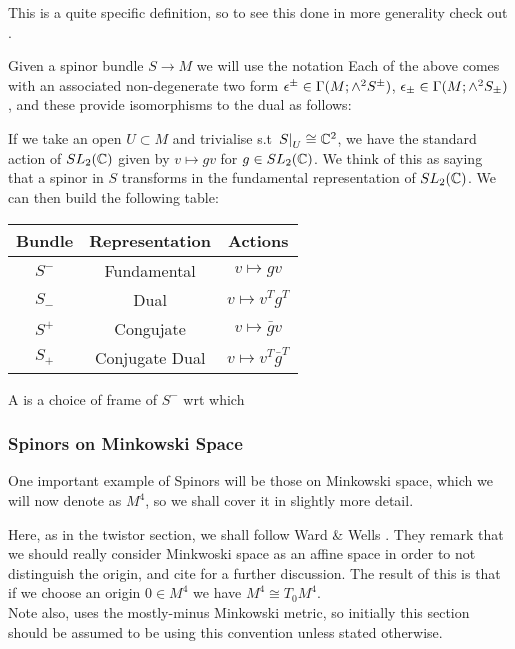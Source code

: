 \documentclass{article}
\begin{document}
\begin{remark}
	This is a quite specific definition, so to see this done in more generality check out \cite{Michelsohn1989}. 
\end{remark}

\begin{notation}
	Given a spinor bundle $S \to M$ we will use the notation 
Each of the above comes with an associated non-degenerate two form $\epsilon^\pm \in \Gamma(M;\wedge^2 S^\pm)$, $ \epsilon_\pm \in \Gamma(M; \wedge^2 S_\pm)$, and these provide isomorphisms to the dual as follows:
\end{notation}
If we take an open $U \subset M$ and trivialise s.t $\left. S \right\rvert_{U} \cong \mathbb{C}^2$, we have the standard action of $SL_2(\mathbb{C})$ given by $v \mapsto gv$ for $g \in SL_2(\mathbb{C})$. We think of this as saying that a spinor in $S$ transforms in the fundamental representation of $SL_2(\mathbb{C})$. We can then build the following table:
\begin{center}
\begin{tabular}{c|c|c}
	Bundle & Representation & Actions \\ \hline \hline 
		$S^-$ & Fundamental & $v \mapsto gv$ \\ \hline 
		$S_-$ & Dual & $v \mapsto v^T g^T $ \\ \hline 
		$S^+$ & Congujate & $v \mapsto \bar{g} v$ \\ \hline 
		$S_+$ & Conjugate Dual & $v \mapsto v^T \bar{g}^T$
\end{tabular}
\end{center}
\begin{definition}
	A  is a choice of frame of $S^-$ wrt which 
\end{definition}
\subsubsection{Spinors on Minkowski Space}
One important example of Spinors will be those on Minkowski space, which we will now denote as $M^4$, so we shall cover it in slightly more detail. 
\begin{remark}
	Here, as in the twistor section, we shall follow Ward \& Wells \cite{Ward1991}. They remark that we should really consider Minkwoski space as an affine space in order to not distinguish the origin, and cite \cite{Shirokov1962} for a further discussion. The result of this is that if we choose an origin $0 \in M^4$ we have $M^4 \cong T_0 M^4$. \\
	Note also, \cite{Ward1991} uses the mostly-minus Minkowski metric, so initially this section should be assumed to be using this convention unless stated otherwise. 
\end{remark}
\end{document}
